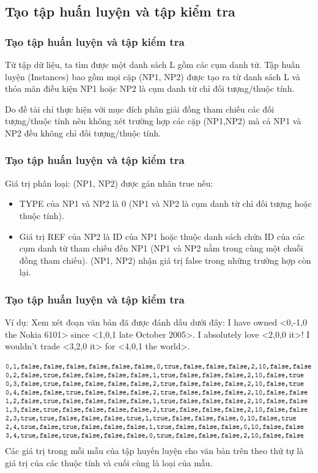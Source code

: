 \documentclass{beamer}
\begin{document}
\subsection{Tạo tập huấn luyện và tập kiểm tra}
\begin{frame}
\frametitle{Tạo tập huấn luyện và tập kiểm tra}
\begin{block}{}
Từ tập dữ liệu, ta tìm được một danh sách L gồm các cụm danh từ. 
Tập huấn luyện (Instances) bao gồm mọi cặp (NP1, NP2) được tạo ra từ danh sách L và thỏa mãn điều kiện NP1 hoặc NP2 là cụm danh từ chỉ đối tượng/thuộc tính. 
\end{block}
\begin{block}{}
Do đề tài chỉ thực hiện với mục đích phân giải đồng tham chiếu các đối tượng/thuộc tính nên không xét trường hợp các cặp (NP1,NP2) mà cả NP1 và NP2 đều không chỉ đối tượng/thuộc tính.
\end{block}
\end{frame}

\begin{frame}
\frametitle{Tạo tập huấn luyện và tập kiểm tra}
\begin{block}{}
Giá trị phân loại: (NP1, NP2) được gán nhãn true nếu:
\begin{itemize}
\item TYPE của NP1 và NP2 là 0 (NP1 và NP2 là cụm danh từ chỉ đối tượng hoặc thuộc tính). 
\item Giá trị REF của NP2 là ID của NP1 hoặc thuộc danh sách chứa ID của các cụm danh từ tham chiếu đến NP1 (NP1 và NP2 nằm trong cùng một chuỗi đồng tham chiếu). (NP1, NP2) nhận giá trị false trong những trường hợp còn lại.
\end{itemize}
\end{block}
\end{frame}

\begin{frame}
\frametitle{Tạo tập huấn luyện và tập kiểm tra}
\begin{block}{}
Ví dụ:
Xem xét đoạn văn bản đã được đánh dấu dưới đây:
I have owned <0,-1,0 the Nokia 6101> since <1,0,1 late October 2005>. I absolutely love <2,0,0 it>! I wouldn't trade <3,2,0 it> for <4,0,1 the world>.
\end{block}
\begin{block}{}
\includegraphics[width=\textwidth]{instance}
\\Các giá trị trong mỗi mẫu của tập huyến luyện cho văn bản trên theo thứ tự là giá trị của các thuộc tính và cuối cùng là loại của mẫu.
\end{block}
\end{frame}
\end{document}
